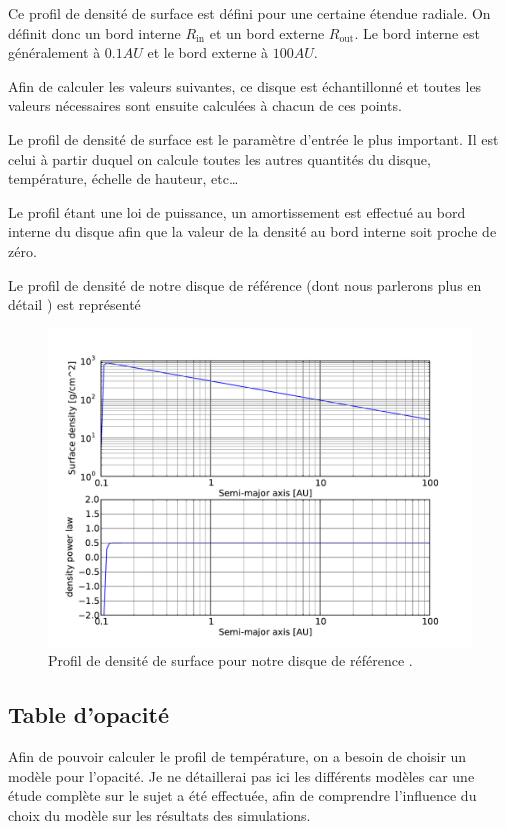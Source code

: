 Ce profil de densité de surface est défini pour une certaine étendue radiale. On définit donc un bord interne $R_\text{in}$ et un bord externe $R_\text{out}$. Le bord interne est généralement à $0.1\unit{AU}$ et le bord externe à $100\unit{AU}$. 

Afin de calculer les valeurs suivantes, ce disque est échantillonné et toutes les valeurs nécessaires sont ensuite calculées à chacun de ces points. 

\bigskip

Le profil de densité de surface est le paramètre d'entrée le plus important. Il est celui à partir duquel on calcule toutes les autres quantités du disque, température, échelle de hauteur, etc\dots

Le profil étant une loi de puissance, un amortissement est effectué au bord interne du disque afin que la valeur de la densité au bord interne soit proche de zéro. 

Le profil de densité de notre disque de référence (dont nous parlerons plus en détail ) est représenté 

\begin{figure}[htb]
\centering
\includegraphics[width=0.75\linewidth]{figure/fiducial_density_profile.pdf}
\caption{Profil de densité de surface pour notre disque de référence \protect{}.}\label{fig:fiducial_density}
\end{figure}

\subsection{Table d'opacité}
Afin de pouvoir calculer le profil de température, on a besoin de choisir un modèle pour l'opacité. Je ne détaillerai pas ici les différents modèles car une étude complète sur le sujet a été effectuée, afin de comprendre l'influence du choix du modèle sur les résultats des simulations. 

